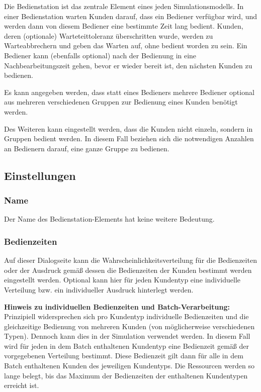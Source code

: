 Die Bedienstation ist das zentrale Element eines jeden Simulationsmodells. In einer Bedienstation warten Kunden darauf,
dass ein Bediener verfügbar wird, und werden dann von diesem Bediener eine bestimmte Zeit lang bedient. Kunden, deren
(optionale) Warteteittoleranz überschritten wurde, werden zu Warteabbrechern und geben das Warten auf, ohne bedient
worden zu sein. Ein Bediener kann (ebenfalls optional) nach der Bedienung in eine Nachbearbeitungszeit gehen, bevor
er wieder bereit ist, den nächsten Kunden zu bedienen.

Es kann angegeben werden, dass statt eines Bedieners mehrere Bediener optional aus mehreren verschiedenen Gruppen zur Bedienung
eines Kunden benötigt werden.

Des Weiteren kann eingestellt werden, dass die Kunden nicht einzeln, sondern in Gruppen bedient werden. In diesem Fall
beziehen sich die notwendigen Anzahlen an Bedienern darauf, eine ganze Gruppe zu bedienen.

\subsection*{Einstellungen}

\subsubsection*{Name}

Der Name des Bedienstation-Elements hat keine weitere Bedeutung.

\subsubsection*{Bedienzeiten}

Auf dieser Dialogseite kann die Wahrscheinlichkeitsverteilung für die Bedienzeiten oder der Ausdruck gemäß
dessen die Bedienzeiten der Kunden bestimmt werden eingestellt werden. Optional
kann hier für jeden Kundentyp eine individuelle Verteilung bzw. ein individueller Ausdruck hinterlegt werden.

\textbf{Hinweis zu individuellen Bedienzeiten und Batch-Verarbeitung:}~\\
Prinzipiell widersprechen sich pro Kundentyp individuelle Bedienzeiten und die gleichzeitige Bedienung von mehreren Kunden
(von möglicherweise verschiedenen Typen). Dennoch kann dies in der Simulation verwendet werden. In diesem Fall wird für jeden
in dem Batch enthaltenen Kundentyp eine Bedienzeit gemäß der vorgegebenen Verteilung bestimmt. Diese Bedienzeit gilt dann
für alle in dem Batch enthaltenen Kunden des jeweiligen Kundentyps. Die Ressourcen werden so lange belegt, bis das
Maximum der Bedienzeiten der enthaltenen Kundentypen erreicht ist.

